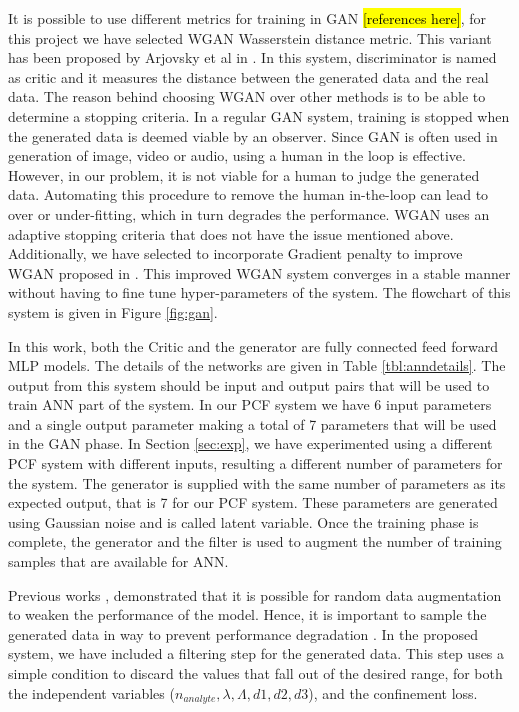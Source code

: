 \documentclass[draft, 10pt]{IEEEtran}
\begin{document}
It is possible to use different metrics for training in GAN \hl{[references here]}, for this project we have selected WGAN Wasserstein distance metric. This variant has been proposed by Arjovsky et al in \cite{arjovsky2017wasserstein}. In this system, discriminator is named as critic and it measures the distance between the generated data and the real data. The reason behind choosing WGAN over other methods is to be able to determine a stopping criteria. In a regular GAN system, training is stopped when the generated data is deemed viable by an observer. Since GAN is often used in generation of image, video or audio, using a human in the loop is effective. However, in our problem, it is not viable for a human to judge the generated data. Automating this procedure to remove the human in-the-loop can lead to over or under-fitting, which in turn degrades the performance. WGAN uses an adaptive stopping criteria that does not have the issue mentioned above. Additionally, we have selected to incorporate Gradient penalty to improve WGAN proposed in \cite{gulrajani2017improved}. This improved WGAN system converges in a stable manner without having to fine tune hyper-parameters of the system. The flowchart of this system is given in Figure \ref{fig:gan}.

In this work, both the Critic and the generator are fully connected feed forward MLP models. The details of the networks are given in Table \ref{tbl:anndetails}. The output from this system should be input and output pairs that will be used to train ANN part of the system. In our PCF system we have 6 input parameters and a single output parameter making a total of 7 parameters that will be used in the GAN phase. In Section \ref{sec:exp}, we have experimented using a different PCF system with different inputs, resulting a different number of parameters for the system. The generator is supplied with the same number of parameters as its expected output, that is 7 for our PCF system. These parameters are generated using Gaussian noise and is called latent variable. Once the training phase is complete, the generator and the filter is used to augment the number of training samples that are available for ANN.

Previous works \cite{ravuri2019seeing, shmelkov2018good}, demonstrated that it is possible for random data augmentation to weaken the performance of the model. Hence, it is important to sample the generated data in way to prevent performance degradation \cite{bhattarai2019sampling}. In the proposed system, we have included a filtering step for the generated data. This step uses a simple condition to discard the values that fall out of the desired range, for both the independent variables ($n_{analyte}, \lambda, \Lambda, d1, d2, d3$), and the confinement loss.
\end{document}
